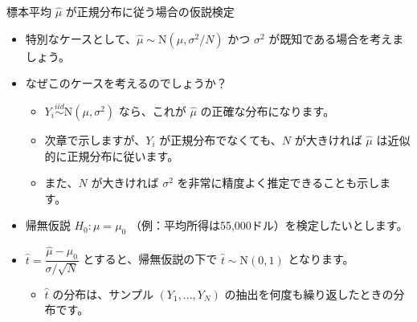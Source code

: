 \documentclass[11pt,handout]{beamer}
\begin{document}
\begin{frame}{標本平均 $\hat\mu$ が正規分布に従う場合の仮説検定}
\begin{itemize}
	\item 
	特別なケースとして、$\hat\mu \sim \mathrm{N}(\mu, \sigma^2/N)$ かつ $\sigma^2$ が既知である場合を考えましょう。
	\medskip
	\pause
	\item
	なぜこのケースを考えるのでしょうか？
\smallskip
		\begin{itemize}
			\item 
			$Y_i \overset{iid}{\sim} \mathrm{N}(\mu,\sigma^2)$ なら、これが $\hat\mu$ の正確な分布になります。\pause
			\smallskip
			\item
			次章で示しますが、$Y_i$ が正規分布でなくても、$N$ が大きければ $\hat\mu$ は近似的に正規分布に従います。
\smallskip\pause{}
\item また、$N$ が大きければ $\sigma^2$ を非常に精度よく推定できることも示します。
		\end{itemize}

	\pause
	\item
	帰無仮説 $H_0:\mu=\mu_0$ （例：平均所得は55,000ドル）を検定したいとします。
	
	\item
	$\hat{t} = \dfrac{\hat\mu - \mu_0 }{ \sigma /\sqrt{N} }$ とすると、帰無仮説の下で $\hat{t} \sim \mathrm{N}(0,1)$ となります。
	\begin{itemize}
	\pause
	\item
	$\hat{t}$ の分布は、サンプル $(Y_1,...,Y_N)$ の抽出を何度も繰り返したときの分布です。
		\end{itemize}
\end{itemize}
\end{frame}
\end{document}
